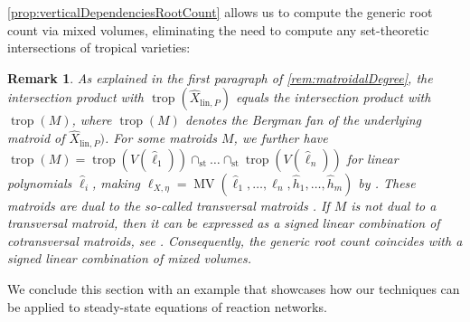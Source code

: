 \documentclass[12pt,reqno,a4paper]{amsart}
\theoremstyle{theoremstyle}
\theoremstyle{examplestyle}
\newtheorem{remark}[theorem]{Remark}
\theoremstyle{algorithmstyle}
\newcommand{\lin}{{\mathrm{lin}}}
\newcommand{\st}{{\mathrm{st}}}
\DeclareMathOperator{\MV}{MV}
\DeclareMathOperator{\trop}{trop}
\begin{document}
\cref{prop:verticalDependenciesRootCount} allows us to compute the generic root count via mixed volumes, eliminating the need to compute any set-theoretic intersections of tropical varieties:

%
\begin{remark}\label{rem:verticalDependenciesRootCount}
  As explained in the first paragraph of \cref{rem:matroidalDegree}, the intersection product with $\trop(\widehat X_{\lin,P})$ equals the intersection product with $\trop(M)$, where $\trop(M)$ denotes the Bergman fan of the underlying matroid of $\widehat X_{\lin,P})$.  For some matroids $M$, we further have $\trop(M)=\trop(V(\hat \ell_1))\cap_\st\dots\cap_\st\trop(V(\hat \ell_n))$ for linear polynomials $\hat \ell_i$, making $\ell_{X,\eta}=\MV(\hat \ell_1,\dots, \hat \ell_n,\hat h_1,\dots, \hat h_m)$ by \cite[Theorem 4.6.9]{MS15}.  These matroids are dual to the so-called \emph{transversal matroids} \cite[Proposition~3.4 and Corollary~5.6]{FinkRinconStiefel2015}. If $M$ is not dual to a transversal matroid, then it can be expressed as a signed linear combination of cotransversal matroids, see \cite{Hampe2017}.   Consequently, the generic root count coincides with a signed linear combination of mixed volumes.
\end{remark}

We conclude this section with an example that showcases how our techniques can be applied to steady-state equations of reaction networks.
\end{document}
